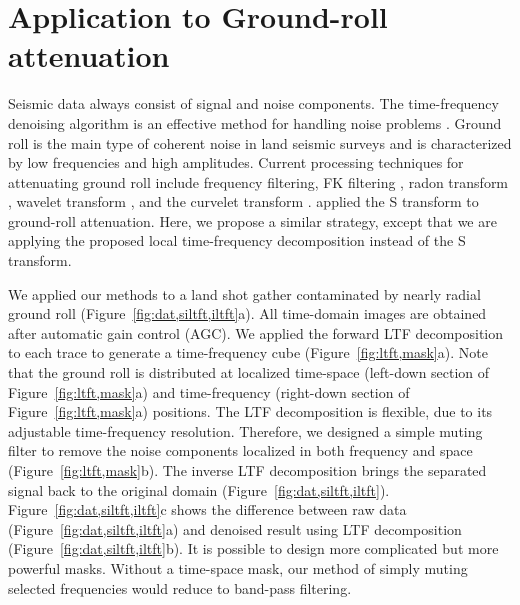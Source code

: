  \section{Application to Ground-roll attenuation}
Seismic data always consist of signal and noise components. The
time-frequency denoising algorithm is an effective method for handling
noise problems \cite[]{Elboth10}. Ground roll is the main type of
coherent noise in land seismic surveys and is characterized by low
frequencies and high amplitudes. Current processing techniques for
attenuating ground roll include frequency filtering,
FK filtering \cite[]{Yilmaz01}, radon transform \cite[]{Liu04},
wavelet transform
\cite[]{GEO62-06-18961903}, and the curvelet transform
\cite[]{Yarham08}. \cite{Askari08} applied the S transform to
ground-roll attenuation. Here, we propose a similar strategy, except
that we are applying the proposed local time-frequency
decomposition instead of the S transform.

We applied our methods to a land shot gather contaminated by nearly
radial ground roll (Figure~\ref{fig:dat,siltft,iltft}a). All
time-domain images are obtained after automatic gain control (AGC). We
applied the forward LTF decomposition to each
trace to generate a time-frequency cube
(Figure~\ref{fig:ltft,mask}a). Note that the ground roll is
distributed at localized time-space (left-down section of
Figure~\ref{fig:ltft,mask}a) and time-frequency (right-down section of
Figure~\ref{fig:ltft,mask}a) positions. The LTF
decomposition is flexible, due to its adjustable
time-frequency resolution. Therefore, we designed a simple muting
filter to remove the noise components localized in both frequency and
space (Figure~\ref{fig:ltft,mask}b). The inverse LTF
decomposition brings the separated signal back 
to the original domain (Figure~\ref{fig:dat,siltft,iltft}).
Figure~\ref{fig:dat,siltft,iltft}c shows the difference between raw
data (Figure~\ref{fig:dat,siltft,iltft}a) and denoised result using
LTF decomposition
(Figure~\ref{fig:dat,siltft,iltft}b). It is possible to design more
complicated but more powerful masks. Without a time-space mask, our
method of simply muting selected frequencies would reduce to band-pass
filtering.

